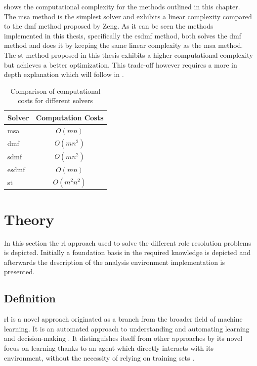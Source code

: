 \documentclass{seal_thesis}
\begin{document}
 shows the computational complexity for the methods outlined in this chapter. The \gls{msa} method is the simplest solver and exhibits a linear complexity compared to the \gls{dmf} method proposed by Zeng. As it can be seen the methods implemented in this thesis, specifically the \gls{esdmf} method, both solves the \gls{dmf} method and does it by keeping the same linear complexity as the \gls{msa} method. The \gls{st} method proposed in this thesis exhibits a higher computational complexity but achieves a better optimization. This trade-off however requires a more in depth explanation which will follow in .

\begin{table}[!ht]
\centering
\begin{tabular}{@{}lc@{}}
\toprule
Solver & Computation Costs \\ \midrule
\gls{msa}    & $O(mn)$           \\
\gls{dmf}   & $O(mn^2)$         \\
\gls{sdmf}  & $O(mn^2)$         \\
\gls{esdmf}  & $O(mn)$           \\
\gls{st} 	   & $O(m^2n^2)$ \\	\bottomrule
\end{tabular}
\caption{Comparison of computational costs for different solvers}
\label{tab:big_oh_solvers}
\end{table}

\section{ Theory}
\label{sec:rl_theory}

In this section the \gls{rl} approach used to solve the different role resolution problems is depicted. Initially a foundation basis in the required knowledge is depicted and afterwards the description of the analysis environment implementation is presented.

\subsection{ Definition}

\gls{rl} is a novel approach originated as a branch from the broader field of machine learning. It is an automated approach to understanding and automating learning and decision-making \cite[p. 15]{Sutton2017}. It distinguishes itself from other approaches by its novel focus on learning thanks to an agent which directly interacts with its environment, without the necessity of relying on training sets \cite[p. 15]{Sutton2017}.
\end{document}
